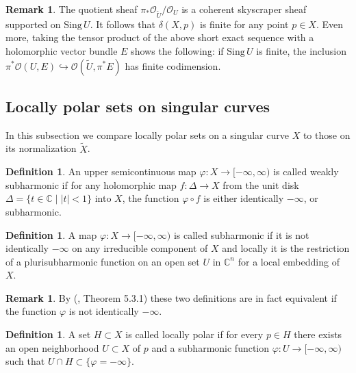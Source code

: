 \documentclass[11pt]{amsart}
\theoremstyle{definition}
\newtheorem{definition}[theorem]{Definition}
\newtheorem{remark}[theorem]{Remark}
\newcommand{\bC}{{\mathbb C}}
\begin{document}
\begin{remark} \label{rem:vegeskodim}
    The quotient sheaf $\pi_*\mathcal{O}_{\widetilde{U}} / \mathcal{O}_U$ is a coherent skyscraper sheaf supported on $\text{Sing}\,U$. It follows that $\delta(X,p)$ is finite for any point $p \in X$. Even more, taking the tensor product of the above short exact sequence with a holomorphic vector bundle $E$ shows the following: if $\text{Sing}\,U$ is finite, the inclusion $\pi^*\mathcal{O}(U,E) \hookrightarrow \mathcal{O}(\widetilde{U},\pi^*E)$ has finite codimension.
\end{remark}


\subsection{Locally polar sets on singular curves} \label{ss:locpol} In this subsection we compare locally polar sets on a singular curve $X$ to those on its normalization $\widetilde{X}$.


\begin{definition} An upper semicontinuous map $\varphi:X\rightarrow [-\infty, \infty)$ is called weakly subharmonic if for any holomorphic map $f:\Delta\rightarrow X$ from the unit disk $\Delta=\{t\in\bC \mid |t|<1\}$ into $X$, the function $\varphi\circ f$ is either identically $-\infty$, or subharmonic.
\end{definition}
\begin{definition}
 A map $\varphi:X\rightarrow [-\infty, \infty)$ is called subharmonic if it is not identically $-\infty$ on any irreducible component of $X$ and locally it is the restriction of a plurisubharmonic function on an open set $U$ in $\bC^n$ for a local embedding of $X$.
\end{definition}

\begin{remark}\label{rem:FN}
    By (\cite{FN80}, Theorem 5.3.1) these two definitions are in fact equivalent if the function $\varphi$ is not identically $-\infty$.
\end{remark}

    \begin{definition}\label{def:locpol}
   A set $H\subset X$ is called locally polar if for every $p\in H$ there exists an open neighborhood $U\subset X$ of $p$ and a subharmonic function $\varphi:U \to [-\infty,\infty)$ such that $U\cap H\subset \{\varphi=-\infty\}$.
\end{definition}
\end{document}
